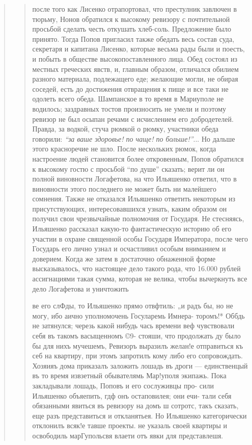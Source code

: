 \begin{quote}
\begin{quote}
после того как Лисенко отрапортовал, что престулник
завлючен в тюрьму, Нонов обратился к высокому ревизору с почтительной 
просьбой сделать честь откушать хлеб-соль. Предложение было принято. 
Тогда Попов пригласил
также обедать весь состав суда, секретаря и капитана
Лисенко, которые весьма рады были и поесть, и побыть в
обществе высокопоставленного лица. Обед состоял из местных греческих явств, и, главным образом, отличался
обилием разного материала, подлежащего еде; желающие
могли, не обирая соседей, есть до достижения отвращения к
пище и все таки не одолеть всего обеда. Шампанское в
то время в Мариуполе не водилось; заздравных тостов
произносить не умели и поэтому ревизор не был осыпан
речами с исчислением его добродетелей. Правда, за водкой,
стуча рюмкой о рюмку, участники обеда говорили: \emph{``за ваше
здоровье! по чаще! по больше!''}... Но дальше этого красноречие не шло.
После нескольких рюмок, когда настроение людей становится более откровенным, Попов обратился к
высокому гостю с просьбой ``по душе'' сказать; верит ли
он полной виновности Логафетова, на что Ильяшенко ответил, что в виновности этого последнего
не может быть ни малейшего сомнения. Также не отказался Ильяшенко ответить некоторым из 
присутствующих, интересовавшихся узнать, каким образом он получил свои чрезвычайные
полномочия от Государя. Не стесняясь, Ильяшенко рассказал 
какую-то фантастическую историю об его участии в
охране священной особы Государя Императора, после чего
Государь его лично узнал и осчастливил особым вниманием и доверием.
Когда же затем в достаточно обнаженной форме высказывалось, что настоящее дело такого рода,
что 16.000 рублей ассигнациями такая сумма, которая не
велика, чтобы вычеркнуть все дело Логафетова и уничтожить

ве его слФды, то Ильяшенко прямо отвфтиль: „и радъ бы,
но не могу, ибо аично уполномочень Госуларемь Имнера-
торомъ!* Оббдь не затянулся; черезь какой нибудь чась
времени веф чувствовали себя въ такомъ васыщенномъ ©9-
стояши, что продолжать ду было бы для нихъ мучешемъ,
Ревизоръ выразилъ желан!е отправиться къ себ на квартиру,
при этомъ запротилъ кому либо его сопровождать. Хозяияъ
дома приказалъ заложить лошадь въ дроги — единственцый
въ то время извзетный обывателямь Мар!уполя экипажь.
Пока закладывали лошадь, Поповъ и его сослуживцы про-
сили Ильяшенко объяепить, гдф онъ остаповилея; они ечи-
тали себя обязанными явиться въ ревизору на домъ ш сотротс,
такъ сказать, еще разъ представиться и откланятьея. Но
Ильяшенко категорически отклонилъ всяк!е тавше проекты.
не указаль своей квартиры и освободиль марГупольсвя влаети
отъ явки для представлешя.


\end{quote}
\end{quote}
